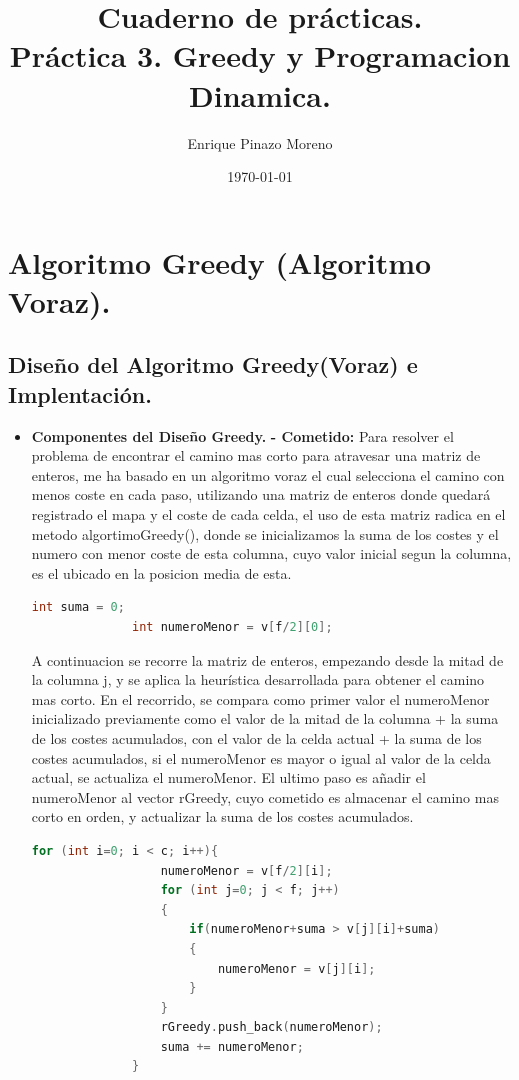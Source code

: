 \documentclass[12pt, letterpaper]{article}
\title{Cuaderno de prácticas. \\Práctica 3. Greedy y Programacion Dinamica.}
\author{Enrique Pinazo Moreno}
\date{\today}
\begin{document}
\maketitle
  \tableofcontents
  \newpage %

  \section{Algoritmo Greedy (Algoritmo Voraz).}
    \subsection{Diseño del Algoritmo Greedy(Voraz) e Implentación.}
      \begin{itemize}
        \item \textbf{Componentes del Diseño Greedy.}
          \subitem\textbf{- Cometido:}
            Para resolver el problema de encontrar el camino mas corto para atravesar una matriz de enteros, me ha basado en un algoritmo voraz el cual selecciona 
            el camino con menos coste en cada paso, utilizando una matriz de enteros donde quedará registrado el mapa y el coste de cada celda, el uso de esta matriz
            radica en el metodo algortimoGreedy(), donde se inicializamos la suma de los costes y el numero con menor coste de esta columna, cuyo valor inicial segun la columna,
            es el ubicado en la posicion media de esta.
            \begin{lstlisting}[language=C++]
              int suma = 0;
              int numeroMenor = v[f/2][0];
            \end{lstlisting}
            A continuacion se recorre la matriz de enteros, empezando desde la mitad de la columna j, y se aplica la heurística desarrollada para obtener el camino mas corto.
            En el recorrido, se compara como primer valor el numeroMenor inicializado previamente como el valor de la mitad de la columna + la suma de los costes acumulados,
            con el valor de la celda actual + la suma de los costes acumulados, si el numeroMenor es mayor o igual al valor de la celda actual, se actualiza el numeroMenor.
            \newline
            El ultimo paso es añadir el numeroMenor al vector rGreedy, cuyo cometido es almacenar el camino mas corto en orden, y actualizar la suma de los costes acumulados.
            
            \begin{lstlisting}[language=C++,basicstyle=\ttfamily\footnotesize]
              for (int i=0; i < c; i++){
                  numeroMenor = v[f/2][i];
                  for (int j=0; j < f; j++)
                  {
                      if(numeroMenor+suma > v[j][i]+suma)
                      {
                          numeroMenor = v[j][i];
                      }
                  }
                  rGreedy.push_back(numeroMenor);
                  suma += numeroMenor;  
              }
              

\end{lstlisting}
\end{itemize}
\end{document}
